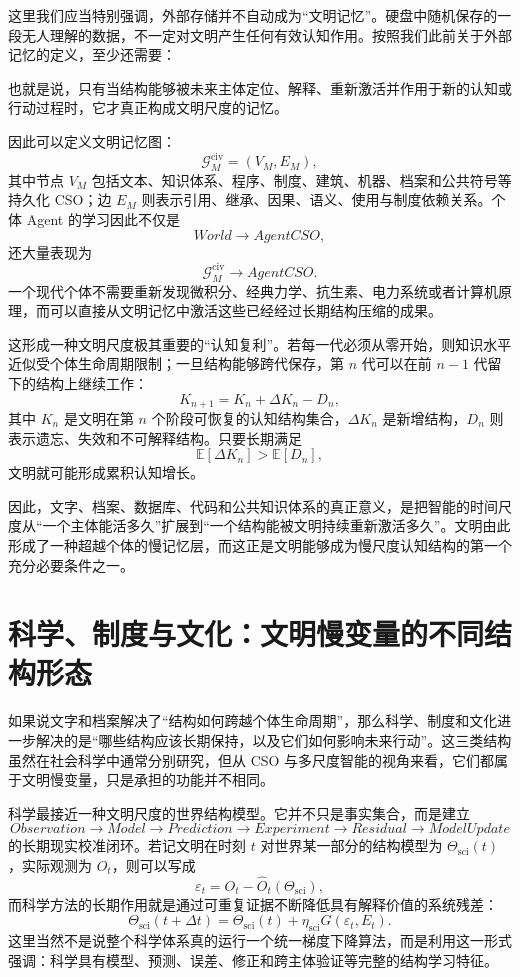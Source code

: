 这里我们应当特别强调，外部存储并不自动成为“文明记忆”。硬盘中随机保存的一段无人理解的数据，不一定对文明产生任何有效认知作用。按照我们此前关于外部记忆的定义，至少还需要：
\begin{statementbox}
\centering
{}
\end{statementbox}
也就是说，只有当结构能够被未来主体定位、解释、重新激活并作用于新的认知或行动过程时，它才真正构成文明尺度的记忆。

因此可以定义文明记忆图：
\[
\mathcal G_M^{\mathrm{civ}}
=
(V_M,E_M),
\]
其中节点 $V_M$ 包括文本、知识体系、程序、制度、建筑、机器、档案和公共符号等持久化 CSO；边 $E_M$ 则表示引用、继承、因果、语义、使用与制度依赖关系。个体 Agent 的学习因此不仅是
\[
World
\rightarrow
AgentCSO,
\]
还大量表现为
\[
\mathcal G_M^{\mathrm{civ}}
\rightarrow
AgentCSO.
\]
一个现代个体不需要重新发现微积分、经典力学、抗生素、电力系统或者计算机原理，而可以直接从文明记忆中激活这些已经经过长期结构压缩的成果。

这形成一种文明尺度极其重要的“认知复利”。若每一代必须从零开始，则知识水平近似受个体生命周期限制；一旦结构能够跨代保存，第 $n$ 代可以在前 $n-1$ 代留下的结构上继续工作：
\[
K_{n+1}
=
K_n
+
\Delta K_n
-
D_n,
\]
其中 $K_n$ 是文明在第 $n$ 个阶段可恢复的认知结构集合，$\Delta K_n$ 是新增结构，$D_n$ 则表示遗忘、失效和不可解释结构。只要长期满足
\[
\mathbb E[\Delta K_n]
>
\mathbb E[D_n],
\]
文明就可能形成累积认知增长。

因此，文字、档案、数据库、代码和公共知识体系的真正意义，是把智能的时间尺度从“一个主体能活多久”扩展到“一个结构能被文明持续重新激活多久”。文明由此形成了一种超越个体的慢记忆层，而这正是文明能够成为慢尺度认知结构的第一个充分必要条件之一。

\section{科学、制度与文化：文明慢变量的不同结构形态}

如果说文字和档案解决了“结构如何跨越个体生命周期”，那么科学、制度和文化进一步解决的是“哪些结构应该长期保持，以及它们如何影响未来行动”。这三类结构虽然在社会科学中通常分别研究，但从 CSO 与多尺度智能的视角来看，它们都属于文明慢变量，只是承担的功能并不相同。

科学最接近一种文明尺度的世界结构模型。它并不只是事实集合，而是建立
\[
Observation
\rightarrow
Model
\rightarrow
Prediction
\rightarrow
Experiment
\rightarrow
Residual
\rightarrow
ModelUpdate
\]
的长期现实校准闭环。若记文明在时刻 $t$ 对世界某一部分的结构模型为 $\Theta_{\mathrm{sci}}(t)$，实际观测为 $O_t$，则可以写成
\[
\varepsilon_t
=
O_t-\hat O_t(\Theta_{\mathrm{sci}}),
\]
而科学方法的长期作用就是通过可重复证据不断降低具有解释价值的系统残差：
\[
\Theta_{\mathrm{sci}}(t+\Delta t)
=
\Theta_{\mathrm{sci}}(t)
+
\eta_{\mathrm{sci}}
G(\varepsilon_t,E_t).
\]
这里当然不是说整个科学体系真的运行一个统一梯度下降算法，而是利用这一形式强调：科学具有模型、预测、误差、修正和跨主体验证等完整的结构学习特征。

